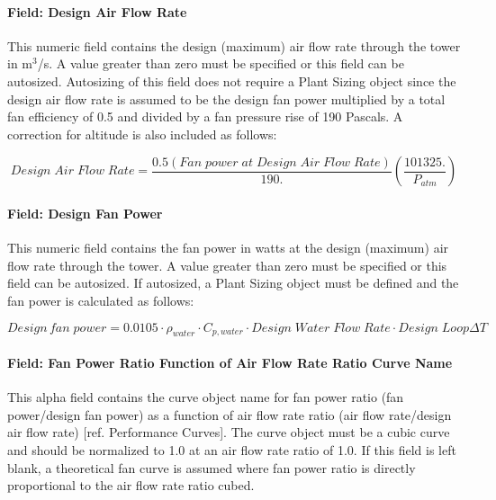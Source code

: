 \paragraph{Field: Design Air Flow Rate}\label{field-design-air-flow-rate-2}

This numeric field contains the design (maximum) air flow rate through the tower in m\(^{3}\)/s. A value greater than zero must be specified or this field can be autosized. Autosizing of this field does not require a Plant Sizing object since the design air flow rate is assumed to be the design fan power multiplied by a total fan efficiency of 0.5 and divided by a fan pressure rise of 190 Pascals. A correction for altitude is also included as follows:

\begin{equation}
Design\;Air\;Flow\;Rate = \frac{{0.5(Fan\;power\;at\;Design\;Air\;Flow\;Rate)}}{{190.}}\left( {\frac{{101325.}}{{{P_{atm}}}}} \right)
\end{equation}

\paragraph{Field: Design Fan Power}\label{field-design-fan-power-1}

This numeric field contains the fan power in watts at the design (maximum) air flow rate through the tower. A value greater than zero must be specified or this field can be autosized. If autosized, a Plant Sizing object must be defined and the fan power is calculated as follows:

\begin{equation}
Design\,fan\;power = 0.0105\cdot {\rho_{water}}\cdot {C_{p,water}}\cdot Design\;Water\;Flow\;Rate\cdot Design\;Loop\Delta T
\end{equation}

\paragraph{Field: Fan Power Ratio Function of Air Flow Rate Ratio Curve Name}\label{field-fan-power-ratio-function-of-air-flow-rate-ratio-curve-name}

This alpha field contains the curve object name for fan power ratio (fan power/design fan power) as a function of air flow rate ratio (air flow rate/design air flow rate) {[}ref. Performance Curves{]}. The curve object must be a cubic curve and should be normalized to 1.0 at an air flow rate ratio of 1.0. If this field is left blank, a theoretical fan curve is assumed where fan power ratio is directly proportional to the air flow rate ratio cubed.

